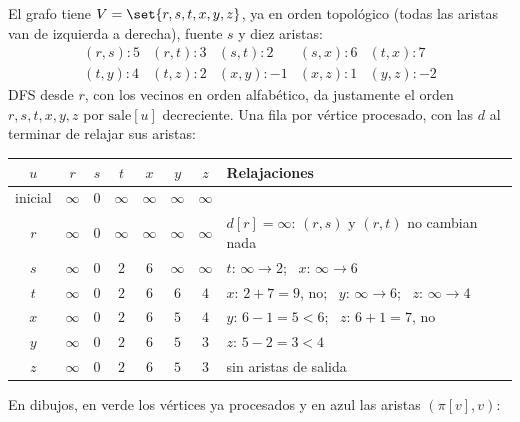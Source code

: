 \documentclass[11pt,letterpaper]{article}
\begin{document}
\begin{ejemplo}
  \label{ej:caminos-dag-24-5}
  El grafo tiene $V = \set{r, s, t, x, y, z}$, ya en orden
  topológico (todas las aristas van de izquierda a derecha), fuente
  $s$ y diez aristas:
  \[
    \begin{array}{lllll}
      (r, s) : 5 & (r, t) : 3 & (s, t) : 2 & (s, x) : 6
        & (t, x) : 7 \\
      (t, y) : 4 & (t, z) : 2 & (x, y) : -1 & (x, z) : 1
        & (y, z) : -2
    \end{array}
  \]
  DFS desde $r$, con los vecinos en orden alfabético, da justamente el
  orden $r, s, t, x, y, z$ por $\text{sale}[u]$ decreciente. Una fila
  por vértice procesado, con las $d$ al terminar de relajar sus
  aristas:
  \begin{center}
  \small
  \begin{tabular}{cccccccl}
    \toprule
    $u$ & $r$ & $s$ & $t$ & $x$ & $y$ & $z$
      & \textbf{Relajaciones} \\
    \midrule
    inicial & $\infty$ & $0$ & $\infty$ & $\infty$ & $\infty$
      & $\infty$ & \\
    $r$ & $\infty$ & $0$ & $\infty$ & $\infty$ & $\infty$ & $\infty$
      & $d[r] = \infty$: $(r, s)$ y $(r, t)$ no cambian nada \\
    $s$ & $\infty$ & $0$ & $2$ & $6$ & $\infty$ & $\infty$
      & $t$: $\infty \to 2$; \ $x$: $\infty \to 6$ \\
    $t$ & $\infty$ & $0$ & $2$ & $6$ & $6$ & $4$
      & $x$: $2 + 7 = 9$, no; \ $y$: $\infty \to 6$;
        \ $z$: $\infty \to 4$ \\
    $x$ & $\infty$ & $0$ & $2$ & $6$ & $5$ & $4$
      & $y$: $6 - 1 = 5 < 6$; \ $z$: $6 + 1 = 7$, no \\
    $y$ & $\infty$ & $0$ & $2$ & $6$ & $5$ & $3$
      & $z$: $5 - 2 = 3 < 4$ \\
    $z$ & $\infty$ & $0$ & $2$ & $6$ & $5$ & $3$
      & sin aristas de salida \\
    \bottomrule
  \end{tabular}
  \end{center}
  En dibujos, en verde los vértices ya procesados y en azul las
  aristas $(\pi[v], v)$:
  \begin{center}
\end{center}
\end{ejemplo}
\end{document}
